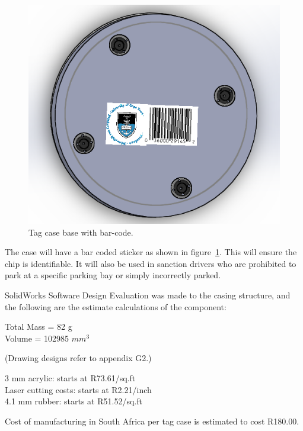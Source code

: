 \begin{figure}[H]
\begin{center}
\includegraphics[scale=0.4]{data/mechanical/5.png}
\caption{Tag case base with bar-code.}
\label{fig:mech-5}
\end{center}
\end{figure}

The case will have a bar coded sticker as shown in figure~\ref{fig:mech-5}. This will ensure the chip is identifiable. It will also be used in sanction drivers who are prohibited to park at a specific parking bay or simply incorrectly parked.

SolidWorks Software Design Evaluation was made to the casing structure, and the following are the estimate calculations of the component:

\begin{center}
Total Mass = 82 g \\
Volume = 102985 $mm^3$
\end{center}

(Drawing designs refer to appendix G2.)

3 mm acrylic: starts at R73.61/sq.ft \\
Laser cutting costs: starts at R2.21/inch \\
4.1 mm rubber: starts at R51.52/sq.ft 

Cost of manufacturing in South Africa per tag case is estimated to cost R180.00.

